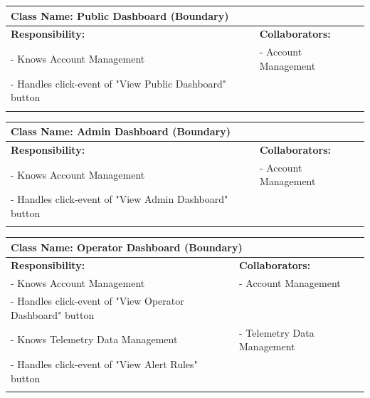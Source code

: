 {	\begin{table}[ht]
		\centering
		\begin{tabular}{|p{8cm}|p{8cm}|}
		\hline 
		 \multicolumn{2}{|l|}{\textbf{Class Name:} Public Dashboard (Boundary)} \\
		\hline
		\textbf{Responsibility:} & \textbf{Collaborators:} \\
		\hline
		 - Knows Account Management & - Account Management \\
		 - Handles click-event of "View Public Dashboard" button \\
		\vspace{1in} & \\
		\hline
		\end{tabular}
	\end{table}

	\begin{table}[H]
		\centering
		\begin{tabular}{|p{8cm}|p{8cm}|}
		\hline 
		 \multicolumn{2}{|l|}{\textbf{Class Name:} Admin Dashboard (Boundary)} \\
		\hline
		\textbf{Responsibility:} & \textbf{Collaborators:} \\
		\hline
		 - Knows Account Management & - Account Management \\
		 - Handles click-event of "View Admin Dashboard" button \\
		\vspace{1in} & \\
		\hline
		\end{tabular}
	\end{table}

	\begin{table}[H]
		\centering
		\begin{tabular}{|p{8cm}|p{8cm}|}
		\hline 
		 \multicolumn{2}{|l|}{\textbf{Class Name:} Operator Dashboard (Boundary)} \\
		\hline
		\textbf{Responsibility:} & \textbf{Collaborators:} \\
		\hline
		 - Knows Account Management & - Account Management \\
		 - Handles click-event of "View Operator Dashboard" button \\
		 - Knows Telemetry Data Management & - Telemetry Data Management \\
		 - Handles click-event of "View Alert Rules" button \\
		\vspace{1in} & \\
		\hline
		\end{tabular}
	\end{table}

}
